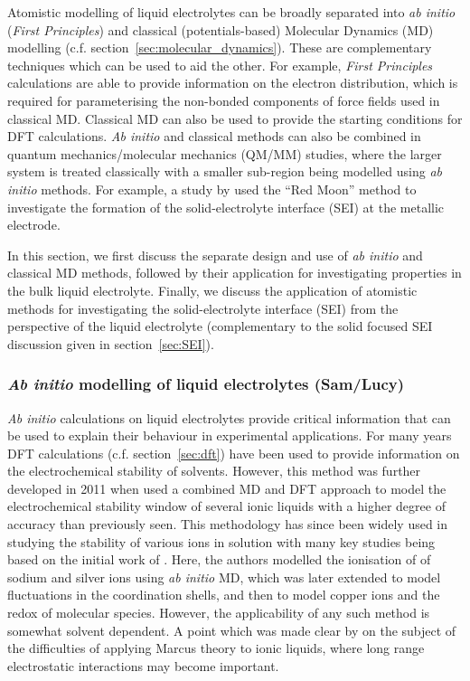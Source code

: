 \documentclass[../main.tex]{subfiles}
\begin{document}
Atomistic modelling of liquid electrolytes can be broadly separated into \textit{ab initio} (\textit{First Principles}) and classical (potentials-based) Molecular Dynamics (MD) modelling (c.f. section~\ref{sec:molecular_dynamics}). These are complementary techniques which can be used to aid the other. For example, \textit{First Principles} calculations are able to provide information on the electron distribution, which is required for parameterising the non-bonded components of force fields used in classical MD. Classical MD can also be used to provide the starting conditions for DFT calculations. \textit{Ab initio} and classical methods can also be combined in quantum mechanics/molecular mechanics (QM/MM) studies, where the larger system is treated classically with a smaller sub-region being modelled using \textit{ab initio} methods. For example, a study by \citeauthor{Fujie_2018} used the ``Red Moon'' method to investigate the formation of the solid-electrolyte interface (SEI) at the metallic electrode\cite{Fujie_2018}.

In this section, we first discuss the separate design and use of \textit{ab initio} and classical MD methods, followed by their application for investigating properties in the bulk liquid electrolyte. Finally, we discuss the application of atomistic methods for investigating the solid-electrolyte interface (SEI) from the perspective of the liquid electrolyte (complementary to the solid focused SEI discussion given in section~\ref{sec:SEI}).

\subsubsection{\textit{Ab initio} modelling of liquid electrolytes (Sam/Lucy)}
\textit{Ab initio} calculations on liquid electrolytes provide critical information that can be used to explain their behaviour in experimental applications. For many years DFT calculations (c.f. section~\ref{sec:dft}) have been used to provide information on the electrochemical stability of solvents\cite{Koch_1996}. However, this method was further developed in 2011 when \citeauthor{ong2011electrochemical} used a combined MD and DFT approach to model the electrochemical stability window of several ionic liquids with a higher degree of accuracy than previously seen\cite{ong2011electrochemical}. This methodology has since been widely used in studying the stability of various ions in solution with many key studies being based on the initial work of \citeauthor{vuilleumier2001electronic}\cite{vuilleumier2001electronic}. Here, the authors modelled the ionisation of of sodium and silver ions using \textit{ab initio} MD, which was later extended to model fluctuations in the coordination shells\cite{blumberger2006diabatic}, and then to model copper\cite{blumberger2004electronic} ions and the redox of molecular species\cite{vandevondele2006solvent}. However, the applicability of any such method is somewhat solvent dependent. A point which was made clear by \citeauthor{lynden2007can} on the subject of the difficulties of applying Marcus theory to ionic liquids, where long range electrostatic interactions may become important\cite{lynden2007can}.
\end{document}

